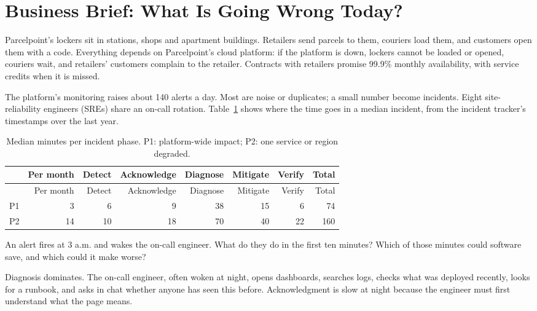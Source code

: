 \section{Business Brief: What Is Going Wrong Today?}
\label{sec:inc-brief}

Parcelpoint's lockers sit in stations, shops and apartment buildings. Retailers send parcels to them, couriers load them, and customers open them with a code. Everything depends on Parcelpoint's cloud platform: if the platform is down, lockers cannot be loaded or opened, couriers wait, and retailers' customers complain to the retailer. Contracts with retailers promise 99.9\% monthly availability, with service credits when it is missed.

The platform's monitoring raises about 140 alerts a day. Most are noise or duplicates; a small number become incidents. Eight site-reliability engineers (SREs) share an on-call rotation. Table~\ref{tab:inc-phases} shows where the time goes in a median incident, from the incident tracker's timestamps over the last year.

\begingroup
\small
\begin{longtable}{@{}lrrrrrrr@{}}
\caption{Median minutes per incident phase. P1: platform-wide impact; P2: one service or region degraded.}\label{tab:inc-phases}\\
\toprule
\rowcolor{coHead} & Per month & Detect & Acknowledge & Diagnose & Mitigate & Verify & Total \\
\midrule
\endfirsthead
\toprule
\rowcolor{coHead} & Per month & Detect & Acknowledge & Diagnose & Mitigate & Verify & Total \\
\midrule
\endhead
P1 & 3 & 6 & 9 & 38 & 15 & 6 & 74 \\
P2 & 14 & 10 & 18 & 70 & 40 & 22 & 160 \\
\bottomrule
\end{longtable}
\endgroup

\begin{thinkabout}
An alert fires at 3 a.m. and wakes the on-call engineer. What do they do in the first ten minutes? Which of those minutes could software save, and which could it make worse?
\end{thinkabout}

Diagnosis dominates. The on-call engineer, often woken at night, opens dashboards, searches logs, checks what was deployed recently, looks for a runbook, and asks in chat whether anyone has seen this before. Acknowledgment is slow at night because the engineer must first understand what the page means.

